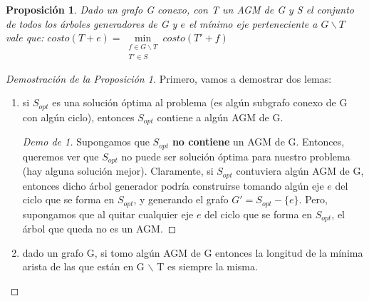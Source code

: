 \documentclass[11pt, a4paper, twoside]{article}
\begin{document}
\newtheorem{prop}{Proposición}
\begin{prop}
Dado un grafo G conexo, con T un AGM de G y S el conjunto de todos los árboles
generadores de G y $e$ el mínimo eje perteneciente a $G \backslash T$ vale que: 
$costo(T+e) = \min\limits_{\substack{f \in G \backslash T \\ T' \in S}} costo(T'+f)$
\end{prop}
\begin{proof}[Demostración de la Proposición 1] 
Primero, vamos a demostrar dos lemas: 
\begin{enumerate}
  \item si $S_{opt}$ es una solución óptima al problema (es algún subgrafo conexo  de G
		con algún ciclo), entonces $S_{opt}$ contiene a algún AGM de G.
		
		\begin{proof}[Demo de 1]
		Supongamos que $S_{opt}$ \textbf{no contiene} un AGM de G. Entonces, queremos ver que
		$S_{opt}$ no puede ser solución óptima para nuestro problema (hay alguna solución mejor).
		Claramente, si $S_{opt}$ contuviera algún AGM de G, entonces dicho árbol generador
		podría construirse tomando algún eje $e$ del ciclo que se forma en $S_{opt}$, y generando
		el grafo $G' = S_{opt} - \{e\}$. Pero, supongamos que al quitar cualquier eje $e$ del ciclo
		que se forma en $S_{opt}$, el árbol que queda no es un AGM. 
		\end{proof}
  
  \item dado un grafo G, si tomo algún AGM de G entonces la longitud de la mínima 
        arista de las que están en G $\backslash$ T es siempre la misma.
        

\end{enumerate}
\end{proof}
\end{document}
